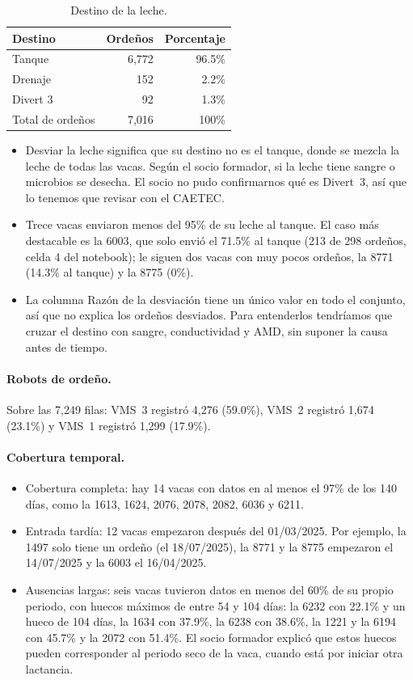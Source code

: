 \documentclass[11pt,letterpaper,DIV=12]{scrartcl}
\begin{document}
\begin{small}
\begin{longtable}{lrr}
\caption{Destino de la leche.}\\
\toprule
Destino & Ordeños & Porcentaje \\
\midrule
\endfirsthead
\bottomrule
\endfoot
Tanque & 6,772 & 96.5\% \\
Drenaje & 152 & 2.2\% \\
Divert 3 & 92 & 1.3\% \\
Total de ordeños & 7,016 & 100\% \\
\end{longtable}
\end{small}

\begin{itemize}
  \item Desviar la leche significa que su destino no es el tanque, donde se mezcla la leche de todas las vacas. Según el socio formador, si la leche tiene sangre o microbios se desecha. El socio no pudo confirmarnos qué es Divert~3, así que lo tenemos que revisar con el CAETEC.
  \item Trece vacas enviaron menos del 95\% de su leche al tanque. El caso más destacable es la 6003, que solo envió el 71.5\% al tanque (213 de 298 ordeños, celda 4 del notebook); le siguen dos vacas con muy pocos ordeños, la 8771 (14.3\% al tanque) y la 8775 (0\%).
  \item La columna Razón de la desviación tiene un único valor en todo el conjunto, así que no explica los  ordeños desviados. Para entenderlos tendríamos que cruzar el destino con sangre, conductividad y AMD, sin suponer la causa antes de tiempo.
\end{itemize}

\paragraph{Robots de ordeño.} Sobre las 7,249 filas: VMS~3 registró 4,276 (59.0\%), VMS~2 registró 1,674 (23.1\%) y VMS~1 registró 1,299 (17.9\%).

\paragraph{Cobertura temporal.}
\begin{itemize}
  \item Cobertura completa: hay 14 vacas con datos en al menos el 97\% de los 140 días, como la 1613, 1624, 2076, 2078, 2082, 6036 y 6211.
  \item Entrada tardía: 12 vacas empezaron después del 01/03/2025. Por ejemplo, la 1497 solo tiene un ordeño (el 18/07/2025), la 8771 y la 8775 empezaron el 14/07/2025 y la 6003 el 16/04/2025.
  \item Ausencias largas: seis vacas tuvieron datos en menos del 60\% de su propio periodo, con huecos máximos de entre 54 y 104 días: la 6232 con 22.1\% y un hueco de 104 días, la 1634 con 37.9\%, la 6238 con 38.6\%, la 1221 y la 6194 con 45.7\% y la 2072 con 51.4\%. El socio formador explicó que estos huecos pueden corresponder al periodo seco de la vaca, cuando está por iniciar otra lactancia.
\end{itemize}
\end{document}
